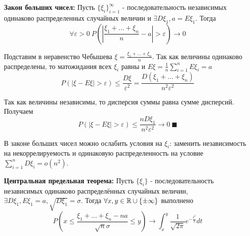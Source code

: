 \par \textbf{Закон больших чисел:} Пусть $\{\xi_i\}_{i=1}^\infty$ - последовательность независимых одинаково распределенных случайных величин и $\exists D\xi_1, a=E\xi_1$. Тогда $$\forall \varepsilon>0 \: P\left(\left|\frac{\xi_1+\ldots+\xi_n}{n}-a\right|>\varepsilon\right) \rightarrow 0$$
\par \Proof Подставим в неравенство Чебышева $\xi=\frac{\xi_1+\ldots+\xi_n}{n}$. Так как величины одинаково распределены, то матожидания всех $\xi_i$ равны и $E\xi=\frac{1}{n}\sum_{i=1}^n E\xi_i=a$
$$P(|\xi-E\xi|>\varepsilon) \leq \frac{D\xi}{\varepsilon^2}=\frac{D(\xi_1+\ldots+\xi_n)}{n^2 \varepsilon^2}$$
\par Так как величины независимы, то дисперсия суммы равна сумме дисперсий. Получаем
$$P(|\xi - E\xi| > \varepsilon)\leq \frac{n D\xi_1}{n^2\varepsilon^2} \rightarrow 0 \: \blacksquare$$

\par \Note В законе больших чисел можно ослабить условия на $\xi_i$: заменить независимость на некоррелируемость и одинаковую распределенность на условие $\sum_{i=1}^n D\xi_i =o(n^2)$.

\par \textbf{Центральная предельная теорема:} Пусть $\{\xi_i\}$ - последовательность независимых одинаково распределённых случайных величин, $\exists D\xi_1, E\xi_1=a, \sqrt{D\xi_1}=\sigma$. Тогда $\forall x, y \in \mathbb{R} \cup \{\pm \infty\}$ выполнено
$$P(x \leq \frac{\xi_1+\ldots+\xi_n-na}{\sqrt{n}\sigma}\leq y)\rightarrow \int_x^y \frac{1}{\sqrt{2\pi}}e^{-\frac{t^2}{2}}dt$$
\newpage{}